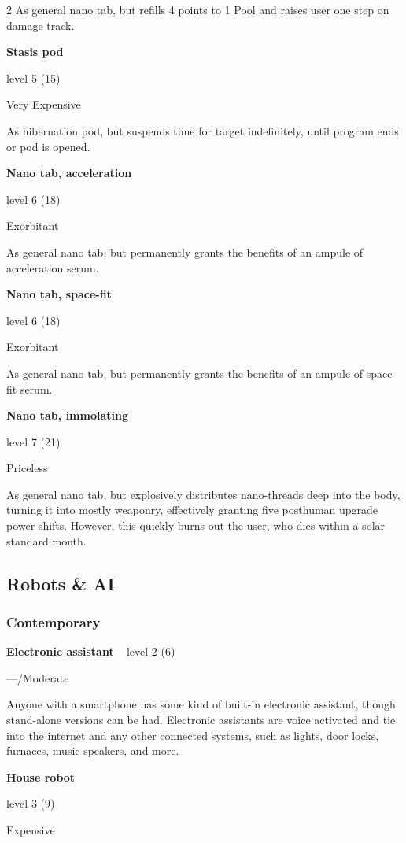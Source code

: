 \begin{multicols}{2}
As general nano tab, but refills 4 points to 1 Pool and raises user one step on damage track. 

\textbf{Stasis pod} 

level 5 (15) 

Very Expensive 

As hibernation pod, but suspends time for target indefinitely, until program ends or pod is opened. 

\textbf{Nano tab, acceleration} 

level 6 (18) 

Exorbitant 

As general nano tab, but permanently grants the benefits of an ampule of acceleration serum. 

\textbf{Nano tab, space-fit}

level 6 (18) 

Exorbitant 

As general nano tab, but permanently grants the benefits of an ampule of space-fit serum. 

\textbf{Nano tab, immolating} 

level 7 (21) 

Priceless 

As general nano tab, but explosively distributes nano-threads deep into the body, turning it into mostly weaponry, effectively granting five posthuman upgrade power shifts. However, this quickly burns out the user, who dies within a solar standard month.

\subsection{Robots \& AI}

\subsubsection{Contemporary}

\textbf{Electronic assistant}
 
level 2 (6) 

—/Moderate 

Anyone with a smartphone has some kind of built-in electronic assistant, though stand-alone versions can be had. Electronic assistants are voice activated and tie into the internet and any other connected systems, such as lights, door locks, furnaces, music speakers, and more. 

\textbf{House robot} 

level 3 (9) 

Expensive 


\end{multicols}
